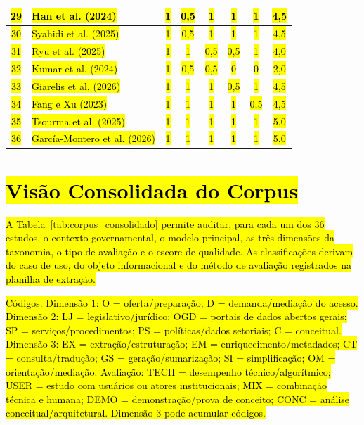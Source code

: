 \documentclass[brazilian]{sbc2025}
\newif\ifhl \hltrue
\newcommand{\rev}[1]{\ifhl\sethlcolor{yellow}\hl{#1}\else#1\fi}
\begin{document}
\begin{table}[p]
\begin{tabular}{|c|p{7.2cm}|c|c|c|c|c|c|}
\rev{29} & \rev{Han et al. (2024)}                   & \rev{1} & \rev{0,5} & \rev{1} & \rev{1} & \rev{1} & \rev{4,5} \\ \hline
\rev{30} & \rev{Syahidi et al. (2025)}               & \rev{1} & \rev{0,5} & \rev{1} & \rev{1} & \rev{1} & \rev{4,5} \\ \hline
\rev{31} & \rev{Ryu et al. (2025)}                   & \rev{1} & \rev{1} & \rev{0,5} & \rev{0,5} & \rev{1} & \rev{4,0} \\ \hline
\rev{32} & \rev{Kumar et al. (2024)}                 & \rev{1} & \rev{0,5} & \rev{0,5} & \rev{0} & \rev{0} & \rev{2,0} \\ \hline
\rev{33} & \rev{Giarelis et al. (2026)}              & \rev{1} & \rev{1} & \rev{1} & \rev{0,5} & \rev{1} & \rev{4,5} \\ \hline
\rev{34} & \rev{Fang e Xu (2023)}                    & \rev{1} & \rev{1} & \rev{1} & \rev{1} & \rev{0,5} & \rev{4,5} \\ \hline
\rev{35} & \rev{Tsourma et al. (2025)}               & \rev{1} & \rev{1} & \rev{1} & \rev{1} & \rev{1} & \rev{5,0} \\ \hline
\rev{36} & \rev{García-Montero et al. (2026)}        & \rev{1} & \rev{1} & \rev{1} & \rev{1} & \rev{1} & \rev{5,0} \\ \hline
\end{tabular}
\end{table}
\clearpage

\section{\texorpdfstring{\rev{Visão Consolidada do Corpus}}{Visao Consolidada do Corpus}}
\label{ap:corpus}

\rev{A Tabela~\mbox{\ref{tab:corpus_consolidado}} permite auditar, para cada um dos 36 estudos, o contexto governamental, o modelo principal, as três dimensões da taxonomia, o tipo de avaliação e o escore de qualidade. As classificações derivam do caso de uso, do objeto informacional e do método de avaliação registrados na planilha de extração.}

\rev{Códigos. Dimensão 1: O = oferta/preparação; D = demanda/mediação do acesso. Dimensão 2: LJ = legislativo/jurídico; OGD = portais de dados abertos gerais; SP = serviços/procedimentos; PS = políticas/dados setoriais; C = conceitual. Dimensão 3: EX = extração/estruturação; EM = enriquecimento/metadados; CT = consulta/tradução; GS = geração/sumarização; SI = simplificação; OM = orientação/mediação. Avaliação: TECH = desempenho técnico/algorítmico; USER = estudo com usuários ou atores institucionais; MIX = combinação técnica e humana; DEMO = demonstração/prova de conceito; CONC = análise conceitual/arquitetural. Dimensão 3 pode acumular códigos.}
\end{document}
